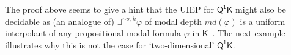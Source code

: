 \documentclass{lmcs} %
\theoremstyle{plain}\newtheorem{satz}[thm]{Satz} %
\newcommand{\nb}[1]{\textcolor{red}{\bf!}%
	\marginpar[\parbox{15mm}{\raggedleft\scriptsize\textcolor{red}{#1}}]%
	{\parbox{15mm}{\raggedright\scriptsize\textcolor{red}{#1}}}}
\newcommand{\md}{\textit{md}}
\newcommand{\FOMK}{\ensuremath{\mathsf{Q^1K}}}
\newcommand{\fform}[1]{\boldsymbol{#1}}
\newcommand{\avar}{\fform{a}}
\newcommand{\bvar}{\fform{b}}
\newcommand{\hvar}{\fform{h}}
\begin{document}
The proof above seems to give a hint that the UIEP for \FOMK{} might also be decidable as (an analogue of) $\exists^{\sim\sigma,k}\varphi$ of modal depth $\md(\varphi)$ is a uniform interpolant of any propositional modal formula $\varphi$ in $\mathsf{K}$~\cite{Visser96}. The next example illustrates why this is not the case for `two-dimensional' $\FOMK$.

\begin{exa}\label{exK}


\end{exa}
\end{document}
